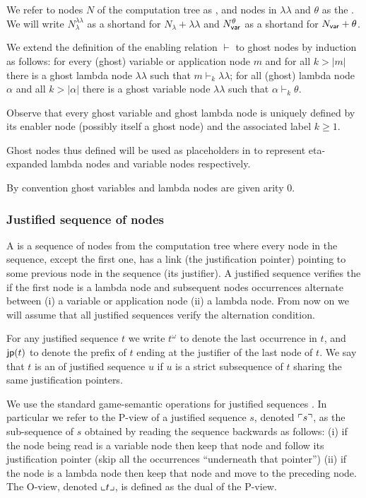 \documentclass{article}
\theoremstyle{definition}
\newcommand\Nodes{N}%
\newcommand\NodesVar{N_{\sf var}}%
\newcommand\NodesLmd{N_\lambda}%
\newcommand{\ghostlmd}{{\lambda\!\!\lambda}}
\newcommand{\ghostvar}{\theta}
\newcommand{\enables}{\vdash}
\begin{document}
We refer to nodes $\Nodes$ of the computation tree as , and nodes in $\ghostlmd$ and $\ghostvar$ as the . We will write $\NodesLmd^\ghostlmd$ as a shortand for $\NodesLmd + \ghostlmd$
and $\NodesVar^\ghostvar$ as a shortand for $\NodesVar + \ghostvar$.

We extend the definition of the enabling relation $\enables$ to ghost nodes by induction as follows: for every (ghost) variable or application node $m$ and for all $k>|m|$ there is a ghost lambda node $\ghostlmd$ such that $m \enables_k \ghostlmd$; for all (ghost) lambda node $\alpha$ and all $k>|\alpha|$ there is a ghost variable node $\ghostlmd$ such that $\alpha \enables_k \ghostvar$.

Observe that every ghost variable and ghost lambda node is uniquely defined by its enabler node (possibly itself a ghost node) and the associated label $k\geq 1$.

Ghost nodes thus defined will be used as placeholders in  to represent eta-expanded lambda nodes and variable nodes respectively.

By convention ghost variables and lambda nodes are given arity $0$.

\subsubsection{Justified sequence of nodes}
A  is a sequence of nodes from the computation tree where every node in the sequence, except the first one, has a link (the justification pointer) pointing to some previous node in the sequence (its justifier). A justified sequence verifies the  if the first node is a lambda node and subsequent nodes occurrences alternate between (i) a variable or application node (ii) a lambda node. From now on we will assume that all justified sequences verify the alternation condition.

For any justified sequence $t$ we write $t^\omega$ to denote the last occurrence in $t$, and ${\sf jp}(t)$ to denote the prefix of $t$ ending at the justifier of the last node of $t$. We say that $t$ is an  of justified sequence $u$ if $u$ is a strict subsequence of $t$ sharing the same justification pointers.

We use the standard game-semantic operations for justified sequences \cite{Abr02}. In particular we refer to the P-view of a justified sequence $s$, denoted $\ulcorner s \urcorner$, as the sub-sequence of $s$ obtained by reading the sequence backwards as follows: (i) if the node being read is a variable node then keep that node and follow its justification pointer (\ie skip  all the occurrences ``underneath that pointer'') (ii) if the node is a lambda node then keep that node and move to the preceding node. The O-view, denoted $\llcorner t \lrcorner$, is defined as the dual of the P-view.
\end{document}
